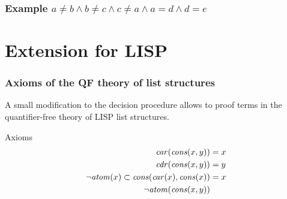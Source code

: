\documentclass[fleqn,t]{beamer}
\newcommand{\car}[1]{\ensuremath\mathit{car}(#1)}
\newcommand{\cdr}[1]{\ensuremath\mathit{cdr}(#1)}
\newcommand{\cons}[1]{\ensuremath\mathit{cons}(#1)}
\newcommand{\atom}[1]{\ensuremath\mathit{atom}(#1)}
\begin{document}
\begin{frame}[fragile]
  \frametitle{Example $a \neq b \land b \neq c \land c \neq a \land a = d \land d = e$ }

\end{frame}

\section{Extension for LISP}

\begin{frame}[t]
  \frametitle{Axioms of the QF theory of list structures}

  A small modification to the decision procedure allows to proof terms in the
  quantifier-free theory of LISP list structures.

  \begin{block}{Axioms}
    \vspace{-0.7cm}
    \begin{align*}
      \car{\cons{x,y}} &= x \\
      \cdr{\cons{x,y}} &= y \\
      \neg \atom{x} \subset \cons{\car{x}, \cons{x}} &= x \\
      \neg \atom{\cons{x,y}} &
    \end{align*} \quad
  \end{block}
\end{frame}
\end{document}
